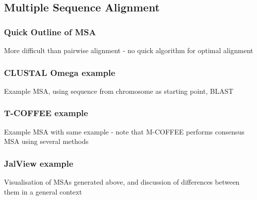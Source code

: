 \documentclass[table]{beamer}
\begin{document}
   \subsection{Multiple Sequence Alignment}
    \begin{frame}
      \frametitle{Quick Outline of MSA}   
      More difficult than pairwise alignment - no quick algorithm for optimal alignment
    \end{frame}

    \begin{frame}
      \frametitle{CLUSTAL Omega example}   
      Example MSA, using sequence from chromosome as starting point, BLAST
    \end{frame}

    \begin{frame}
      \frametitle{T-COFFEE example}   
      Example MSA with same example - note that M-COFFEE performs consensus MSA using several methods
    \end{frame}

    \begin{frame}
      \frametitle{JalView example}   
      Visualisation of MSAs generated above, and discussion of differences between them in a general context
    \end{frame}
\end{document}
